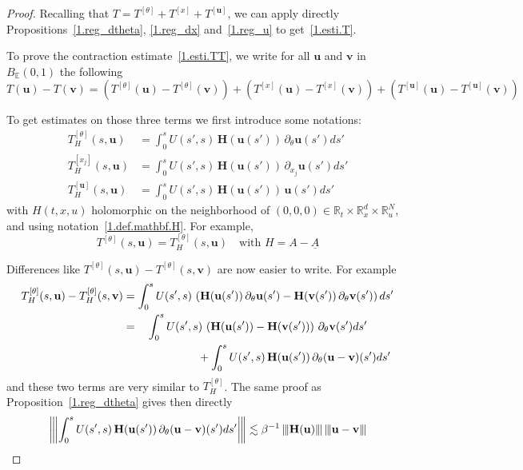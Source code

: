 \documentclass[AHL,Unicode,longabstracts,published]{cedram}
\theoremstyle{plain}
\newcommand*\R{{\mathbb R}}
\newcommand{\dptl}{\partial}%
\newcommand*\EE{{\mathbb E}}
\newcommand{\ubf}{{\mathbf u}}
\newcommand{\vbf}{{\mathbf v}}
\newcommand{\Hbf}{{\mathbf H}}
\newcommand*\und{\underline}
\DeclarePairedDelimiter{\VERT}{|\mkern -1.6mu|\mkern -1.6mu|}{|\mkern -1.6mu|\mkern -1.6mu|}
\begin{document}
\begin{proof}
Recalling that $T = T^{[\theta]} + T^{[x]} + T^{[\ubf]}$, we can apply directly Propositions~\ref{1.reg_dtheta}, \ref{1.reg_dx} and~\ref{1.reg_u} to get~\eqref{1.esti.T}.

To prove the contraction estimate~\eqref{1.esti.TT}, we write for all $\ubf$ and $\vbf$ in $B_{\EE}(0,1)$ the following
\[
T(\ubf) - T(\vbf) = \left(T^{[\theta]}(\ubf)-T^{[\theta]}(\vbf)\right) + \left(T^{[x]}(\ubf)-T^{[x]}(\vbf)\right) + \left(T^{[\ubf]}(\ubf)- T^{[\ubf]}(\vbf)\right)
\]

To get estimates on those three terms we first introduce some notations:
\begin{align*}
T_{H}^{[\theta]}(s,\ubf) & = \int_{0}^{s} U(s',s) \,\Hbf(\ubf(s')) \,\dptl_{\theta} \ubf(s') ds' \\
T_{H}^{[x_j]}(s,\ubf) & = \int_{0}^{s} U(s',s)\, \Hbf(\ubf(s')) \, \dptl_{x_j} \ubf(s') ds' \\
T_{H}^{[\ubf]}(s,\ubf) & = \int_{0}^{s} U(s',s) \, \Hbf(\ubf(s')) \, \ubf(s') ds'
\end{align*}
with $H(t,x,u)$ holomorphic on the neighborhood of $(0,0,0)\in\R_{t}\times\R_{x}^{d}\times\R_{u}^{N}$, and using notation~\eqref{1.def.mathbf.H}. For example,
\begin{equation}\label{1.T_H_theta}
T^{[\theta]}(s,\ubf) = T_{H}^{[\theta]}(s,\ubf) \quad \text{with } H = A - \und{A}
\end{equation}


Differences like $T^{[\theta]}(s,\ubf) - T^{[\theta]}(s,\vbf)$ are now easier to write. For example
\begin{equation}\label{1.one}
\begin{aligned}
T_{H}^{[\theta]}(s,\ubf) - T_{H}^{[\theta]}(s,\vbf) & = \int_{0}^{s} U(s',s) \,\left(\Hbf(\ubf(s')) \,\dptl_{\theta} \ubf(s') - \Hbf(\vbf(s')) \,\dptl_{\theta} \vbf(s') \right) ds' \\
& = \phantom{+}\int_{0}^{s} U(s',s) \,\left(\Hbf(\ubf(s')) - \Hbf(\vbf(s'))\right) \,\dptl_{\theta} \vbf(s') ds' 
\\
& \mkern 120mu+ \int_{0}^{s} U(s',s) \,\Hbf(\ubf(s')) \,\dptl_{\theta} (\ubf-\vbf)(s') ds'
\end{aligned}
\end{equation}
and these two terms are very similar to $T_{H}^{[\theta]}$. The same proof as Proposition~\ref{1.reg_dtheta} gives then directly
\[
\left|\mkern -1.6mu\left|\mkern -1.6mu\left| \int_{0}^{s} U(s',s) \,\Hbf(\ubf(s')) \,\dptl_{\theta} (\ubf-\vbf)(s') ds' \right|\mkern -1.6mu\right|\mkern -1.6mu\right| \lesssim \beta^{-1} \,\VERT{\Hbf(\ubf)}\, \VERT{\ubf - \vbf}
\]



\end{proof}
\end{document}
